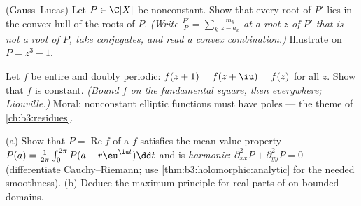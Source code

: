 \begin{exercise}[$\star\star\star$]\label{exo:b3:holomorphic:8}
(Gauss--Lucas) Let $P \in \C[X]$ be nonconstant. Show that
every root of $P'$ lies in the convex hull of the roots of
$P$. \emph{(Write $\frac{P'}{P} = \sum_k\frac{m_k}{z - a_k}$
at a root $z$ of $P'$ that is not a root of $P$, take
conjugates, and read a convex combination.)} Illustrate on
$P = z^3 - 1$.
\end{exercise}

\begin{exercise}[$\star\star\star$]\label{exo:b3:holomorphic:9}
Let $f$ be entire and doubly periodic: $f(z + 1) = f(z + \iu)
= f(z)$ for all $z$. Show that $f$ is constant. \emph{(Bound
$f$ on the  fundamental square, then everywhere;
Liouville.)} Moral: nonconstant elliptic functions must have
poles --- the theme of \cref{ch:b3:residues}.
\end{exercise}

\begin{exercise}[$\star\star$]\label{exo:b3:holomorphic:10}
(a) Show that $P = \operatorname{Re}f$ of a  $f$
satisfies the mean value property $P(a) =
\frac1{2\pi}\int_0^{2\pi}P(a + r\eu^{\iu t})\dd t$ and is
\emph{harmonic}: $\partial^2_{xx}P + \partial^2_{yy}P = 0$
(differentiate Cauchy--Riemann; use
\cref{thm:b3:holomorphic:analytic} for the needed smoothness).
(b) Deduce the maximum principle for real parts of  on bounded domains.
\end{exercise}

